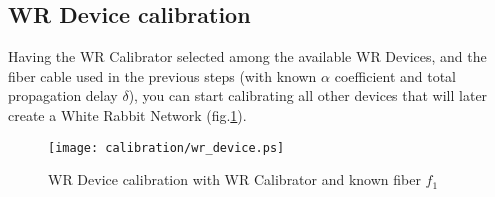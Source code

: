 \subsection{WR Device calibration} 
\label{subsec:devices}

Having the WR Calibrator selected among the available WR Devices, and the fiber
cable used in the previous steps (with known $\alpha$ coefficient and total
propagation delay $\delta$), you can start calibrating all other devices that
will later create a White Rabbit Network (fig.\ref{fig:devices}). 

\begin{figure}[ht]
	\begin{center}
		\texttt{[image: calibration/wr\_device.ps]}
		\caption{WR Device calibration with WR Calibrator and known
		fiber $f_1$}
		\label{fig:devices}
	\end{center}
\end{figure}

